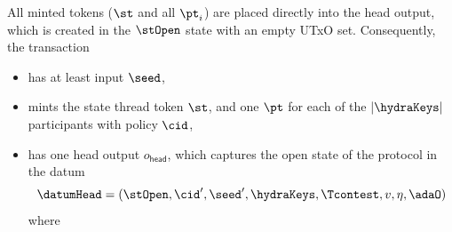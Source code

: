 \noindent All minted tokens ($\st$ and all $\pt_{i}$) are placed directly into
the head output, which is created in the $\stOpen$ state with an empty UTxO set.
Consequently, the \mtxInit{} transaction
\begin{itemize}
	\item has at least input $\seed$,
	\item mints the state thread token $\st$, and one $\pt$ for each of the $|\hydraKeys|$
	      participants with policy $\cid$,
	\item has one head output
	      $o_{\mathsf{head}}$, which captures
	      the open state of the protocol in the datum
	      \[
		      \datumHead = (\stOpen,\cid',\seed',\hydraKeys,\Tcontest,v,\eta,\adaO)
	      \]
	      where
\end{itemize}

